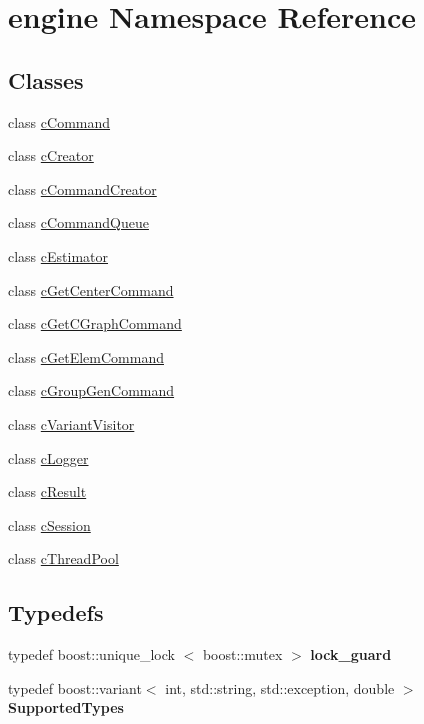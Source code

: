 \hypertarget{namespaceengine}{\section{engine \-Namespace \-Reference}
\label{namespaceengine}
}
\subsection*{\-Classes}
\begin{DoxyCompactItemize}
\item 
class \hyperlink{classengine_1_1cCommand}{c\-Command}
\item 
class \hyperlink{classengine_1_1cCreator}{c\-Creator}
\item 
class \hyperlink{classengine_1_1cCommandCreator}{c\-Command\-Creator}
\item 
class \hyperlink{classengine_1_1cCommandQueue}{c\-Command\-Queue}
\item 
class \hyperlink{classengine_1_1cEstimator}{c\-Estimator}
\item 
class \hyperlink{classengine_1_1cGetCenterCommand}{c\-Get\-Center\-Command}
\item 
class \hyperlink{classengine_1_1cGetCGraphCommand}{c\-Get\-C\-Graph\-Command}
\item 
class \hyperlink{classengine_1_1cGetElemCommand}{c\-Get\-Elem\-Command}
\item 
class \hyperlink{classengine_1_1cGroupGenCommand}{c\-Group\-Gen\-Command}
\item 
class \hyperlink{classengine_1_1cVariantVisitor}{c\-Variant\-Visitor}
\item 
class \hyperlink{classengine_1_1cLogger}{c\-Logger}
\item 
class \hyperlink{classengine_1_1cResult}{c\-Result}
\item 
class \hyperlink{classengine_1_1cSession}{c\-Session}
\item 
class \hyperlink{classengine_1_1cThreadPool}{c\-Thread\-Pool}
\end{DoxyCompactItemize}
\subsection*{\-Typedefs}
\begin{DoxyCompactItemize}
\item 
\hypertarget{namespaceengine_af1b349928e8ef52af7a7b83676140e9d}{typedef boost\-::unique\-\_\-lock\*
$<$ boost\-::mutex $>$ {\bfseries lock\-\_\-guard}}\label{namespaceengine_af1b349928e8ef52af7a7b83676140e9d}

\item 
\hypertarget{namespaceengine_a942a6c5eb4358a465a03cbf32bd4546e}{typedef boost\-::variant$<$ int, \*
std\-::string, std\-::exception, \*
double $>$ {\bfseries \-Supported\-Types}}\label{namespaceengine_a942a6c5eb4358a465a03cbf32bd4546e}

\end{DoxyCompactItemize}
